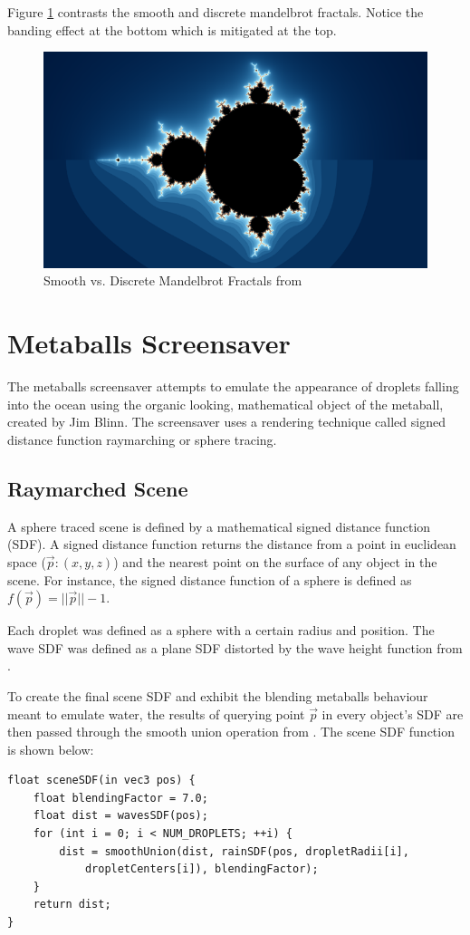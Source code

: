 \documentclass[10pt, openany]{book}
\begin{document}
Figure \ref{fig:smooth-mandel} contrasts the smooth and discrete mandelbrot fractals. Notice the banding effect at the bottom which is mitigated at the top.

\begin{figure}[H]
	\centering
	\includegraphics[width=0.4\linewidth]{SmoothMandelbrot}
	\caption{Smooth vs. Discrete Mandelbrot Fractals from \citep{quilez-smooth}}
	\label{fig:smooth-mandel}
\end{figure}

\section{Metaballs Screensaver}

The metaballs screensaver attempts to emulate the appearance of droplets falling into the ocean using the organic looking, mathematical object of the metaball, created by Jim Blinn. The screensaver uses a rendering technique called signed distance function raymarching or sphere tracing.

\subsection{Raymarched Scene}
A sphere traced scene is defined by a mathematical signed distance function (SDF). A signed distance function returns the distance from a point in euclidean space ($\vec{p}: (x,y,z)$) and the nearest point on the surface of any object in the scene. For instance, the signed distance function of a sphere is defined as $f(\vec{p}) = ||\vec{p}|| - 1$. 

Each droplet was defined as a sphere with a certain radius and position. The wave SDF was defined as a plane SDF distorted by the wave height function from \citep{fast-waves}.

To create the final scene SDF and exhibit the blending metaballs behaviour meant to emulate water, the results of querying point $\vec{p}$ in every object's SDF are then passed through the smooth union operation from \citep{quilez-dist}. The scene SDF function is shown below:

\begin{verbatim}
float sceneSDF(in vec3 pos) {
	float blendingFactor = 7.0;
	float dist = wavesSDF(pos);
	for (int i = 0; i < NUM_DROPLETS; ++i) {
		dist = smoothUnion(dist, rainSDF(pos, dropletRadii[i], 
			dropletCenters[i]), blendingFactor);
	}
	return dist;
}
\end{verbatim}
\end{document}
